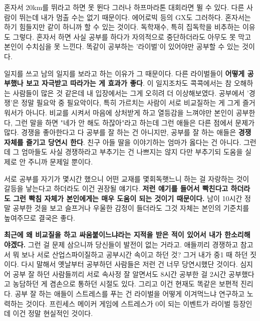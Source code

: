 혼자서 20km를 뛰라고 하면 못 뛴다
그러나 하프마라톤 대회라면 뛸 수 있다. 다른 사람이 뛰는데 내가 멈출 수는 없기 때문이다.
에어로빅 등의 GX도 그러하다.  혼자서는 하기 힘들지만 같이 하니까 할 수 있는 것이다.
독학재수, 특히 집독학을 비추하는 이유도 그렇다.
혼자서 하면 사실 공부를 하다가 자의적으로 중단하더라도 아무도 못 막고 본인이 수치심을 못 느낀다.
똑같이 공부하는 '라이벌'이 있어야만 공부할 수 있는 것이다.
\vspace{5mm}

일지를 쓰고 남의 일지를 보라고 하는 이유가 그 때문이다. 다른 라이벌들이 \textbf{어떻게 공부했나 보고 자극받고 따라가는 게 효과가 좋다}.
이 일지조차도 콕콕에서는 참 오해하는 사람들이 많은 것 같은데 내 입장에서는 그게 오히려 더 이상해보였다.
공부에서 '경쟁'은 정말 필요악 중 필요악이다, 특히 가르치는 사람이 서로 비교질하는 게 그게 즐거워서가 아니다.
비교를 시켜서 마음에 상처받게 하고 열등감을 느껴야만 본인이 공부한다,
그런 말을 하면 "네가 안 해도 하잖아"라고 하는데 그런 애들은 다른 점에서 문제가 많다.
경쟁을 좋아한다고 다 공부를 잘 하는 건 아니지만, 공부를 잘 하는 애들은 \textbf{경쟁 자체를 즐기고 당연시 한다}.
친구 아들 딸을 이야기하는 엄마가 옳다는 건 아니다. 그런데 그 엄마들도 사실 경쟁하라고 부추기는 건 나쁘지는 않지
다만 부추기되 도움을 실제로 안 주니까 문제일 뿐이다.
\vspace{5mm}

서로 공부를 자기가 몇시간 했으니 어떤 교재를 몇회독햇느니 하는 걸 자랑하는 것이 갈등을 낳는다고 하더라도 이건 권장될 얘기다.
\textbf{저런 얘기를 들어서 빡친다고 하더라도 그런 빡침 자체가 본인에게는 매우 도움이 되는 것이기 때문이다.}
남이 10시간 정말 공부한 것을 보고 슬프거나 우울한 감정이 들더라도 그것 자체는 본인의 기준치를 높여주므로 결국은 좋다.
\vspace{5mm}

\textbf{최근에 왜 비교질을 하고 싸움붙이느냐라는 지적을 받은 적이 있어서 내가 한소리해야겠다.}
그런 걸 문제 삼으니까 당신들이 발전이 없는 거라고.
애들끼리 경쟁하고 참고서 뭐 보나 서로 산업스파이질하고 공부시간 속이고 하던 것?
그거 내가 중1 때 하던 짓이다. 다시 말해서 옛날부터 공부하던 사람들은 저런 건 너무 당연시했단 것이다.
심지어 공부 잘 하던 사람들끼리 서로 속사정 잘 알면서도 8시간 공부한 걸 2시간 공부했다고 농담하던 게 겸손으로 통하던 시절도 있다.
그리고 이건 현재도 똑같은 보편적 진리다.
공부 잘 하는 애들이 스트레스를 푸는 건 라이벌을 어떻게 이겨먹느냐 연구하고 노력하는 것이다.
프린세스 메이커 게임에 스트레스가 0이 되는 이벤트가 라이벌 등장인데 이건 정말 현실적인 것이다.
\vspace{5mm}

